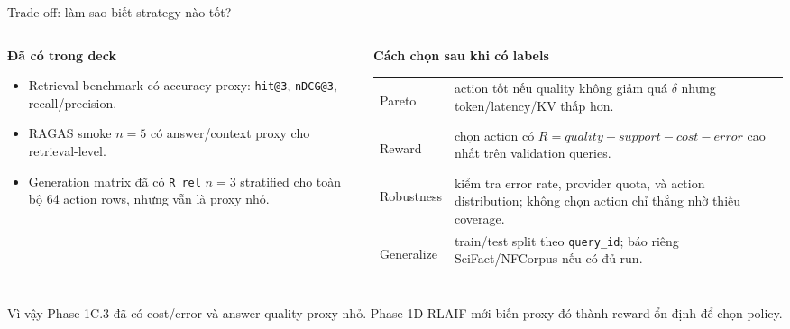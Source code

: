 \documentclass[aspectratio=169,10pt]{beamer}
\newcommand{\smallcode}[1]{\texttt{\scriptsize #1}}
\newcommand{\minihead}[1]{{\bfseries\color{AccentDark}#1}}
\newenvironment{tightitemize}{\begin{itemize}\setlength{\itemsep}{0.22em}\setlength{\parskip}{0pt}}{\end{itemize}}
\begin{document}
\begin{frame}{Trade-off: làm sao biết strategy nào tốt?}
  \small
  \begin{columns}[T,onlytextwidth]
    \begin{column}{0.44\textwidth}
      \minihead{Đã có trong deck}\\[-0.08cm]
      \begin{tightitemize}
        \item Retrieval benchmark có accuracy proxy: \smallcode{hit@3}, \smallcode{nDCG@3}, recall/precision.
        \item RAGAS smoke \(n=5\) có answer/context proxy cho retrieval-level.
        \item Generation matrix đã có \smallcode{R rel} \(n=3\) stratified cho toàn bộ 64 action rows, nhưng vẫn là proxy nhỏ.
      \end{tightitemize}
    \end{column}
    \begin{column}{0.52\textwidth}
      \minihead{Cách chọn sau khi có labels}\\[-0.08cm]
      \scriptsize
      \renewcommand{\arraystretch}{1.12}
      \begin{tabular}{>{\bfseries\raggedright\arraybackslash}p{}>{\raggedright\arraybackslash}p{}}
        Pareto & action tốt nếu quality không giảm quá \(\delta\) nhưng token/latency/KV thấp hơn. \\
        Reward & chọn action có \(R=quality+support-cost-error\) cao nhất trên validation queries. \\
        Robustness & kiểm tra error rate, provider quota, và action distribution; không chọn action chỉ thắng nhờ thiếu coverage. \\
        Generalize & train/test split theo \smallcode{query\_id}; báo riêng SciFact/NFCorpus nếu có đủ run. \\
      \end{tabular}
    \end{column}
  \end{columns}

  \vspace{0.32cm}
  \centering
  \footnotesize\color{Muted}
  Vì vậy Phase 1C.3 đã có cost/error và answer-quality proxy nhỏ. Phase 1D RLAIF mới biến proxy đó thành reward ổn định để chọn policy.
\end{frame}
\end{document}
